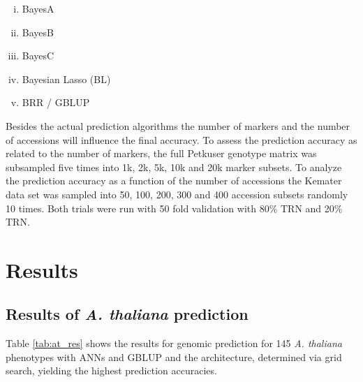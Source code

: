 \onehalfspacing
\begin{enumerate}[(i)]
\item BayesA
\item BayesB
\item BayesC
\item Bayesian Lasso (BL)
\item BRR / GBLUP
\end{enumerate}
\doublespacing

Besides the actual prediction algorithms the number of markers and the number of
accessions will influence the final accuracy. To assess the prediction accuracy as related
to the number of markers, the full Petkuser genotype matrix was subsampled five times into
1k, 2k, 5k, 10k and 20k marker subsets. To analyze the prediction accuracy as a function
of the number of accessions the Kemater data set was sampled into 50, 100, 200, 300 and 400
accession subsets randomly 10 times. Both trials were run with 50 fold validation with
80\% TRN and 20\% TRN.


\section{Results} \label{res:gp}
\subsection{Results of \textit{A. thaliana} prediction} \label{res:gp:at} Table
\ref{tab:at_res} shows the results for genomic prediction for 145 \textit{A. thaliana}
phenotypes with ANNs and GBLUP and the architecture, determined via grid search, yielding
the highest prediction accuracies.

